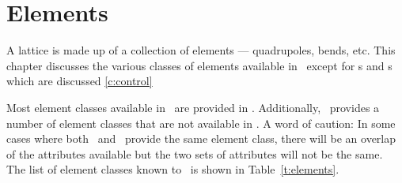 \chapter{Elements}
\label{c:elements}

A lattice is made up of a collection of elements --- quadrupoles,
bends, etc. This chapter discusses the various classes of elements
available in \bmad\ except for s and s which are
discussed \cref{c:control}

Most element classes available in \mad\ are provided in \bmad.
Additionally, \bmad\ provides a number of element classes that are not
available in \mad.  A word of caution: In some cases where both \mad\
and \bmad\ provide the same element class, there will be an overlap of 
the attributes available but the two sets of attributes will not be the same.
The list of element classes known to \bmad\ is shown in Table~\ref{t:elements}.

